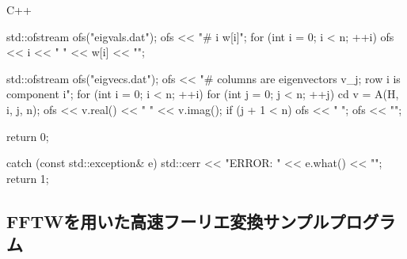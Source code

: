 \documentclass[12pt]{jreport}
\begin{document}
\begin{codebox}{C++}
{{        {
            std::ofstream ofs("eigvals.dat");
            ofs << "# i  w[i]\n";
            for (int i = 0; i < n; ++i) {
                ofs << i << " " << w[i] << "\n";
            }
        }

        {
            std::ofstream ofs("eigvecs.dat");
            ofs << "# columns are eigenvectors v_j; row i is component i\n";
            for (int i = 0; i < n; ++i) {
                for (int j = 0; j < n; ++j) {
                    cd v = A(H, i, j, n);
                    ofs << v.real() << " " << v.imag();
                    if (j + 1 < n) ofs << "   ";
                }
                ofs << "\n";
            }
        }

        return 0;
    } catch (const std::exception& e) {
        std::cerr << "ERROR: " << e.what() << "\n";
        return 1;
    }
}
\end{codebox}

\subsection{FFTWを用いた高速フーリエ変換サンプルプログラム}
\end{document}
